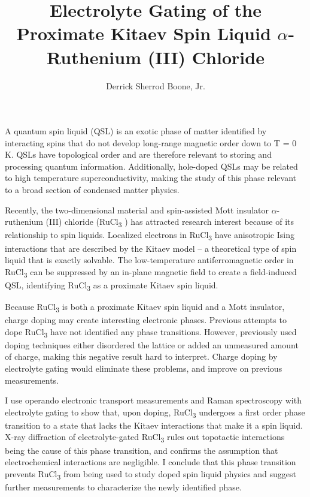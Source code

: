 \documentclass[12pt]{report}
\title{Electrolyte Gating of the Proximate Kitaev Spin Liquid $\alpha$-Ruthenium (III) Chloride}
\author{Derrick Sherrod Boone, Jr.}
\newcommand{\rucl}{RuCl\textsubscript{3} }
\begin{document}

    \beforepreface


A quantum spin liquid (QSL) is an exotic phase of matter identified by interacting spins that do not develop long-range magnetic order down to T = 0 K. QSLs have topological order and are therefore relevant to storing and processing quantum information. Additionally, hole-doped QSLs may be related to high temperature superconductivity, making the study of this phase relevant to a broad section of condensed matter physics.

Recently, the two-dimensional material and spin-assisted Mott insulator $\alpha$-ruthenium (III) chloride (\rucl) has attracted research interest because of its relationship to spin liquids. Localized electrons in \rucl have anisotropic Ising interactions that are described by the Kitaev model – a theoretical type of spin liquid that is exactly solvable. The low-temperature antiferromagnetic order in \rucl can be suppressed by an in-plane magnetic field to create a field-induced QSL, identifying \rucl as a proximate Kitaev spin liquid.

Because \rucl is both a proximate Kitaev spin liquid and a Mott insulator, charge doping may create interesting electronic phases. Previous attempts to dope \rucl have not identified any phase transitions. However, previously used doping techniques either disordered the lattice or added an unmeasured amount of charge, making this negative result hard to interpret. Charge doping by electrolyte gating would eliminate these problems, and improve on previous measurements.

I use operando electronic transport measurements and Raman spectroscopy with electrolyte gating to show that, upon doping, \rucl undergoes a first order phase transition to a state that lacks the Kitaev interactions that make it a spin liquid. X-ray diffraction of electrolyte-gated \rucl rules out topotactic interactions being the cause of this phase transition, and confirms the assumption that electrochemical interactions are negligible. I conclude that this phase transition prevents \rucl from being used to study doped spin liquid physics and suggest further measurements to characterize the newly identified phase.
\end{document}
